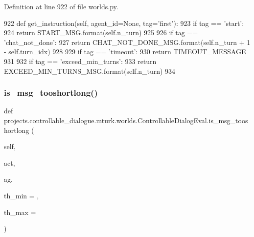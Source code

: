 Definition at line 922 of file worlds.\+py.


\begin{DoxyCode}
922     \textcolor{keyword}{def }get\_instruction(self, agent\_id=None, tag='first'):
923         \textcolor{keywordflow}{if} tag == \textcolor{stringliteral}{'start'}:
924             \textcolor{keywordflow}{return} START\_MSG.format(self.n\_turn)
925 
926         \textcolor{keywordflow}{if} tag == \textcolor{stringliteral}{'chat\_not\_done'}:
927             \textcolor{keywordflow}{return} CHAT\_NOT\_DONE\_MSG.format(self.n\_turn + 1 - self.turn\_idx)
928 
929         \textcolor{keywordflow}{if} tag == \textcolor{stringliteral}{'timeout'}:
930             \textcolor{keywordflow}{return} TIMEOUT\_MESSAGE
931 
932         \textcolor{keywordflow}{if} tag == \textcolor{stringliteral}{'exceed\_min\_turns'}:
933             \textcolor{keywordflow}{return} EXCEED\_MIN\_TURNS\_MSG.format(self.n\_turn)
934 
\end{DoxyCode}
\mbox{\label{classprojects_1_1controllable__dialogue_1_1mturk_1_1worlds_1_1ControllableDialogEval_acdbda424344d9c0bf3051e48f931a120}} 
\subsubsection{\texorpdfstring{is\+\_\+msg\+\_\+tooshortlong()}{is\_msg\_tooshortlong()}}
{\footnotesize\ttfamily def projects.\+controllable\+\_\+dialogue.\+mturk.\+worlds.\+Controllable\+Dialog\+Eval.\+is\+\_\+msg\+\_\+tooshortlong (\begin{DoxyParamCaption}\item[{}]{self,  }\item[{}]{act,  }\item[{}]{ag,  }\item[{}]{th\+\_\+min = {},  }\item[{}]{th\+\_\+max = {} }\end{DoxyParamCaption})}




